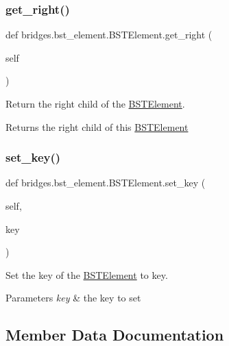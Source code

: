 \subsubsection{\texorpdfstring{get\+\_\+right()}{get\_right()}}
{\footnotesize\ttfamily def bridges.\+bst\+\_\+element.\+B\+S\+T\+Element.\+get\+\_\+right (\begin{DoxyParamCaption}\item[{}]{self }\end{DoxyParamCaption})}



Return the right child of the \mbox{\hyperlink{classbridges_1_1bst__element_1_1_b_s_t_element}{B\+S\+T\+Element}}. 

\begin{DoxyReturn}{Returns}
the right child of this \mbox{\hyperlink{classbridges_1_1bst__element_1_1_b_s_t_element}{B\+S\+T\+Element}} 
\end{DoxyReturn}
\mbox{\label{classbridges_1_1bst__element_1_1_b_s_t_element_a426506dad61594f1a581e599f3944feb}} 
\subsubsection{\texorpdfstring{set\+\_\+key()}{set\_key()}}
{\footnotesize\ttfamily def bridges.\+bst\+\_\+element.\+B\+S\+T\+Element.\+set\+\_\+key (\begin{DoxyParamCaption}\item[{}]{self,  }\item[{}]{key }\end{DoxyParamCaption})}



Set the key of the \mbox{\hyperlink{classbridges_1_1bst__element_1_1_b_s_t_element}{B\+S\+T\+Element}} to key. 


\begin{DoxyParams}{Parameters}
{\em key} & the key to set \\
\hline
\end{DoxyParams}


\subsection{Member Data Documentation}
\mbox{\label{classbridges_1_1bst__element_1_1_b_s_t_element_a8b4c0d8d6a2a7e0fefb013038d26f146}} 
